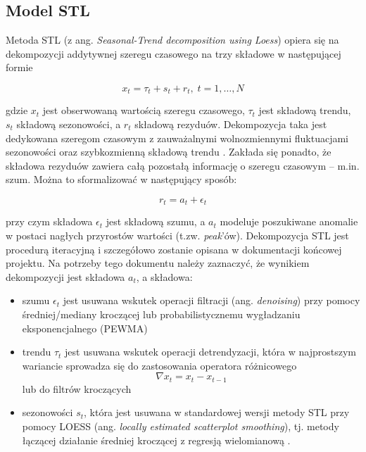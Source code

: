 \subsection{Model STL}
\label{subsection:stl}

Metoda STL (z ang. \emph{Seasonal-Trend decomposition using Loess})
opiera się na dekompozycji addytywnej szeregu czasowego na trzy składowe
w następującej formie

\begin{equation*}
x_{t} = \tau_{t} + s_{t} + r_{t},\; t = 1, \dots, N
\end{equation*}


gdzie \(x_{t}\) jest obserwowaną wartością szeregu czasowego,
\(\tau_{t}\) jest składową trendu, \(s_{t}\) składową sezonowości, a
\(r_{t}\) składową rezyduów. Dekompozycja taka jest dedykowana szeregom
czasowym z zauważalnymi wolnozmiennymi fluktuacjami sezonowości oraz
szybkozmienną składową trendu \cite{wen-gao}. Zakłada się
ponadto, że składowa rezyduów zawiera całą pozostałą informację o
szeregu czasowym -- m.in. szum. Można to sformalizować w następujący
sposób:

\begin{equation*}
  r_{t} = a_{t} + \epsilon_{t}
\end{equation*}


przy czym składowa \(\epsilon_{t}\) jest składową szumu, a \(a_{t}\)
modeluje poszukiwane anomalie w postaci nagłych przyrostów wartości
(t.zw. \emph{peak}'ów). Dekompozycja STL jest procedurą iteracyjną i
szczegółowo zostanie opisana w dokumentacji końcowej projektu. Na
potrzeby tego dokumentu należy zaznaczyć, że wynikiem dekompozycji jest
składowa \(a_{t}\), a składowa:

\begin{itemize}
\item
  szumu \(\epsilon_{t}\) jest usuwana wskutek operacji filtracji (ang.
  \emph{denoising}) przy pomocy średniej/mediany kroczącej lub
  probabilistycznemu wygładzaniu eksponencjalnego (PEWMA) \cite{PEWMA}
\item
  trendu \(\tau_{t}\) jest usuwana wskutek operacji detrendyzacji, która
  w najprostszym wariancie sprowadza się do zastosowania operatora
  różnicowego \begin{equation*} \nabla x_{t} = x_{t} - x_{t -1} \end{equation*}
    lub do filtrów kroczących
\item
  sezonowości \(s_{t}\), która jest usuwana w standardowej wersji
  metody STL przy pomocy LOESS (ang. \emph{locally estimated scatterplot
  smoothing}), tj. metody łączącej działanie średniej kroczącej z
  regresją wielomianową \cite{stl-origin}.
\end{itemize}

